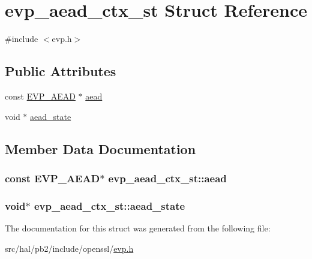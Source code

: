\hypertarget{structevp__aead__ctx__st}{}\section{evp\+\_\+aead\+\_\+ctx\+\_\+st Struct Reference}
\label{structevp__aead__ctx__st}


{\ttfamily \#include $<$evp.\+h$>$}

\subsection*{Public Attributes}
\begin{DoxyCompactItemize}
\item 
const \hyperlink{evp_8h_a47c0f99815228a662a556b79ae50df9e}{E\+V\+P\+\_\+\+A\+E\+AD} $\ast$ \hyperlink{structevp__aead__ctx__st_a49feccc76f949b1d2be830de5355e15a}{aead}
\item 
void $\ast$ \hyperlink{structevp__aead__ctx__st_ae1ddcf3eb8747b29bd0f8dd1340debfb}{aead\+\_\+state}
\end{DoxyCompactItemize}


\subsection{Member Data Documentation}
\subsubsection[{\texorpdfstring{aead}{aead}}]{\setlength{\rightskip}{0pt plus 5cm}const {\bf E\+V\+P\+\_\+\+A\+E\+AD}$\ast$ evp\+\_\+aead\+\_\+ctx\+\_\+st\+::aead}\hypertarget{structevp__aead__ctx__st_a49feccc76f949b1d2be830de5355e15a}{}\label{structevp__aead__ctx__st_a49feccc76f949b1d2be830de5355e15a}
\subsubsection[{\texorpdfstring{aead\+\_\+state}{aead_state}}]{\setlength{\rightskip}{0pt plus 5cm}void$\ast$ evp\+\_\+aead\+\_\+ctx\+\_\+st\+::aead\+\_\+state}\hypertarget{structevp__aead__ctx__st_ae1ddcf3eb8747b29bd0f8dd1340debfb}{}\label{structevp__aead__ctx__st_ae1ddcf3eb8747b29bd0f8dd1340debfb}


The documentation for this struct was generated from the following file\+:\begin{DoxyCompactItemize}
\item 
src/hal/pb2/include/openssl/\hyperlink{evp_8h}{evp.\+h}\end{DoxyCompactItemize}
